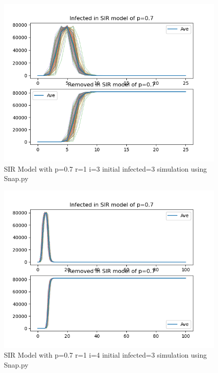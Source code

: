 \documentclass{subfile}
\begin{document}
  \begin{figure}
  \includegraphics[scale=0.8]{sirp07r1i3s3}
  \caption[SIR p=0.7,r=1,i=3,init infected=3]{SIR Model with p=0.7 r=1 i=3 initial infected=3 simulation using Snap.py}
  \end{figure}
  \begin{figure}
  \includegraphics[scale=0.8]{sirp07r1i4s3}
  \caption[SIR p=0.7,r=1,i=4,init infected=3]{SIR Model with p=0.7 r=1 i=4 initial infected=3 simulation using Snap.py}
  \end{figure}
\end{document}
